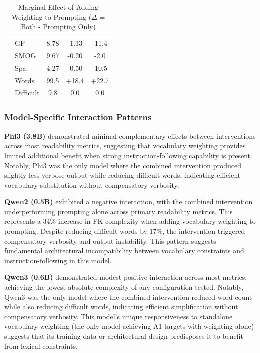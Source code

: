 \documentclass[10pt, a4paper]{article}
\begin{document}
\begin{table}[!ht]
\begin{center}
\begin{tabular}{llccc}
          & GF          & 8.78  & -1.13 & -11.4 \\
          & SMOG        & 9.67  & -0.20 & -2.0  \\
          & Spa.        & 4.27  & -0.50 & -10.5 \\
          & Words       & 99.5  & +18.4 & +22.7 \\
          & Difficult & 9.8   & 0.0   & 0.0   \\
\hline
\end{tabular}
\caption{Marginal Effect of Adding Weighting to Prompting ($\Delta$ = Both - Prompting Only)}
\label{tab:table2}
\end{center}
\end{table}

\subsubsection{Model-Specific Interaction Patterns}


\textbf{Phi3 (3.8B)} demonstrated minimal complementary effects between interventions across most readability metrics, suggesting that vocabulary weighting provides limited additional benefit when strong instruction-following capability is present. Notably, Phi3 was the only model where the combined intervention produced slightly less verbose output while reducing difficult words, indicating efficient vocabulary substitution without compensatory verbosity.

\textbf{Qwen2 (0.5B)} exhibited a negative interaction, with the combined intervention underperforming prompting alone across primary readability metrics. This represents a $34\%$ increase in FK complexity when adding vocabulary weighting to prompting. Despite reducing difficult words by $17\%$, the intervention triggered compensatory verbosity and output instability. This pattern suggests fundamental architectural incompatibility between vocabulary constraints and instruction-following in this model.

\textbf{Qwen3 (0.6B)} demonstrated modest positive interaction across most metrics, achieving the lowest absolute complexity of any configuration tested. Notably, Qwen3 was the only model where the combined intervention reduced word count while also reducing difficult words, indicating efficient simplification without compensatory verbosity. This model's unique responsiveness to standalone vocabulary weighting (the only model achieving A1 targets with weighting alone) suggests that its training data or architectural design predisposes it to benefit from lexical constraints.
\end{document}
